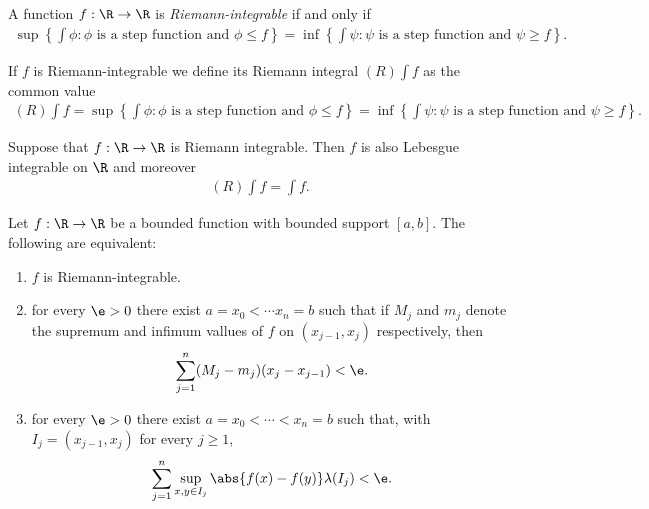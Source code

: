 \documentclass{article}
\begin{document}
\begin{theorem}[Notes 4.5]
	A function $f:\R\to\R$ is \emph{Riemann-integrable} if and only if
	\begin{align*}
		\sup\left\lbrace\int\phi : \phi\text{ is a step function and }\phi\leq f\right\rbrace
		= \inf\left\lbrace\int\psi : \psi\text{ is a step function and }\psi \geq f\right\rbrace.
	\end{align*}
\end{theorem}

\begin{definition}[Notes 4.5]
	If $f$ is Riemann-integrable we define its Riemann integral $(R) \int f$ as the common
	value
	\begin{align*}
		(R) \int f
		=\sup\left\lbrace\int\phi : \phi\text{ is a step function and }\phi\leq f\right\rbrace
		= \inf\left\lbrace\int\psi : \psi\text{ is a step function and }\psi \geq f\right\rbrace.
	\end{align*}
\end{definition}

\begin{theorem}[Notes 4.6]
	Suppose that $f:\R\to\R$ is Riemann integrable. Then $f$ is also Lebesgue integrable on $\R$
	and moreover
	\begin{align*}
		(R) \int f = \int f.
	\end{align*}
\end{theorem}

\begin{lemma}[Notes 4.1]
	Let $f:\R\to\R$ be a bounded function with bounded support $[a,b]$. The following are equivalent:
	\begin{enumerate}
		\item $f$ is Riemann-integrable.
		\item for every $\e>0$ there exist $a=x_0<\cdots x_n=b$ such that if $M_j$ and $m_j$
		      denote the supremum and infimum vallues of $f$ on $(x_{j-1}, x_j)$ respectively, then \begin{align*}
			      \sum_{j=1}^n (M_j-m_j)(x_j-x_{j-1})<\e.
		      \end{align*}
		\item for every $\e>0$ there exist $a=x_0<\cdots<x_n=b$ such that, with $I_j=(x_{j-1},x_j)$
		      for every $j\geq 1$, \begin{align*}
			      \sum_{j=1}^n \sup_{x,y\in I_j} \abs{f(x)-f(y)}\lambda(I_j)<\e.
		      \end{align*}
	\end{enumerate}
\end{lemma}
\end{document}
